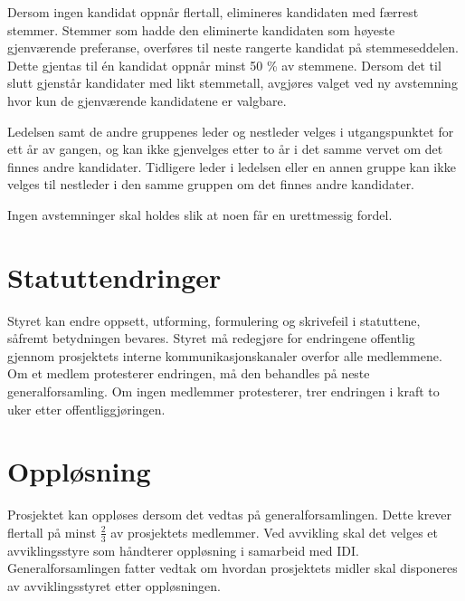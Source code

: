 Dersom ingen kandidat oppnår flertall, elimineres kandidaten med færrest stemmer.
Stemmer som hadde den eliminerte kandidaten som høyeste gjenværende preferanse, overføres til neste rangerte kandidat på stemmeseddelen.
Dette gjentas til én kandidat oppnår minst 50 \% av stemmene.
Dersom det til slutt gjenstår kandidater med likt stemmetall, avgjøres valget ved ny avstemning hvor kun de gjenværende kandidatene er valgbare.

Ledelsen samt de andre gruppenes leder og nestleder velges i utgangspunktet for ett år av gangen, og kan ikke gjenvelges etter to år i det samme vervet om det finnes andre kandidater.
Tidligere leder i ledelsen eller en annen gruppe kan ikke velges til nestleder i den samme gruppen om det finnes andre kandidater.

Ingen avstemninger skal holdes slik at noen får en urettmessig fordel.


\section{Statuttendringer}\label{sec:statuttendringer}
Styret kan endre oppsett, utforming, formulering og skrivefeil i statuttene, såfremt betydningen bevares.
Styret må redegjøre for endringene offentlig gjennom prosjektets interne kommunikasjonskanaler overfor alle medlemmene.
Om et medlem protesterer endringen, må den behandles på neste generalforsamling.
Om ingen medlemmer protesterer, trer endringen i kraft to uker etter offentliggjøringen.


\section{Oppløsning}\label{sec:oppløsning}
Prosjektet kan oppløses dersom det vedtas på generalforsamlingen.
Dette krever flertall på minst $\frac{2}{3}$ av prosjektets medlemmer.
Ved avvikling skal det velges et avviklingsstyre som håndterer oppløsning i samarbeid med IDI.\@
Generalforsamlingen fatter vedtak om hvordan prosjektets midler skal disponeres av avviklingsstyret etter oppløsningen.
